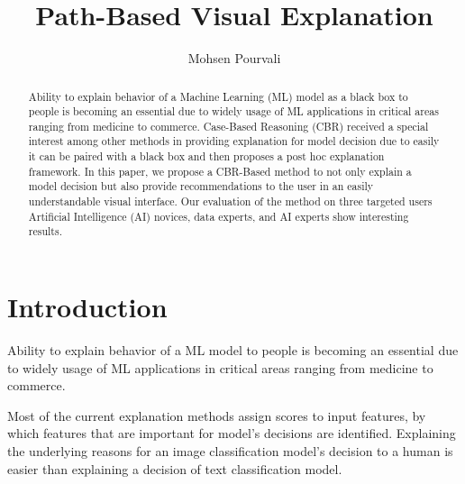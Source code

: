 \documentclass{llncs}
\begin{document}
\title{Path-Based Visual Explanation}

\author{Mohsen Pourvali}

\maketitle


\begin{abstract}
Ability to explain behavior of a Machine Learning (ML) model as a black box to people is becoming an essential due to widely usage of ML applications in critical areas ranging from medicine to commerce. Case-Based Reasoning (CBR) received a special interest among other methods in providing explanation for model decision due to easily it can be paired with a black box and then proposes a post hoc explanation framework. In this paper, we propose a CBR-Based method to not only explain a model decision but also provide recommendations to the user in an easily understandable visual interface. Our evaluation of the method on three targeted users Artificial Intelligence (AI) novices, data experts, and AI experts show interesting results.
\end{abstract}




\section{Introduction}
Ability to explain behavior of a ML model to people is becoming an essential due to widely usage of ML applications in critical areas ranging from medicine to commerce. 

Most of the current explanation methods assign scores to input features, by which features that are important for model’s decisions are identified.
Explaining the underlying reasons for an image classification model’s decision to a human is easier than explaining a decision of text classification model. 
\end{document}
